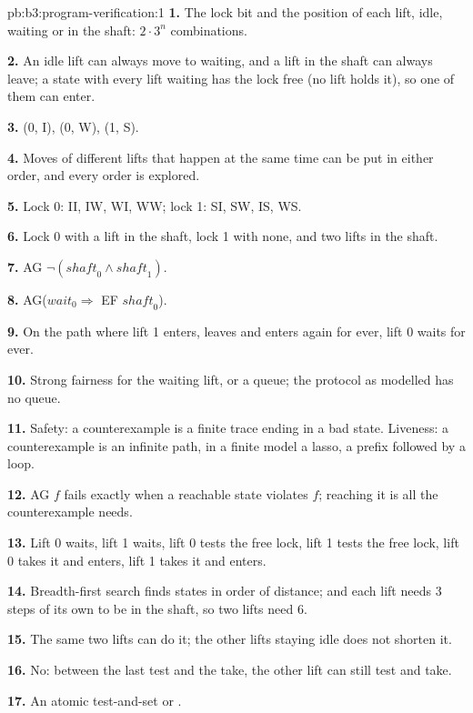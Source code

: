 \begin{solution}{pb:b3:program-verification:1}
\textbf{1.} The lock bit and the position of each lift, idle, waiting or in the shaft: $2 \cdot 3^n$ combinations.

\textbf{2.} An idle lift can always move to waiting, and a lift in the shaft can always leave; a state with every lift waiting has the lock free (no lift holds it), so one of them can enter.

\textbf{3.} (0, I), (0, W), (1, S).

\textbf{4.} Moves of different lifts that happen at the same time can be put in either order, and every order is explored.

\textbf{5.} Lock 0: II, IW, WI, WW; lock 1: SI, SW, IS, WS.

\textbf{6.} Lock 0 with a lift in the shaft, lock 1 with none, and two lifts in the shaft.

\textbf{7.} AG $\neg(\mathit{shaft}_0 \wedge \mathit{shaft}_1)$.

\textbf{8.} AG($\mathit{wait}_0 \Rightarrow$ EF $\mathit{shaft}_0$).

\textbf{9.} On the path where lift 1 enters, leaves and enters again for ever, lift 0 waits for ever.

\textbf{10.} Strong fairness for the waiting lift, or a queue; the protocol as modelled has no queue.

\textbf{11.} Safety: a counterexample is a finite trace ending in a bad state. Liveness: a counterexample is an infinite path, in a finite model a lasso, a prefix followed by a loop.

\textbf{12.} AG $f$ fails exactly when a reachable state violates $f$; reaching it is all the counterexample needs.

\textbf{13.} Lift 0 waits, lift 1 waits, lift 0 tests the free lock, lift 1 tests the free lock, lift 0 takes it and enters, lift 1 takes it and enters.

\textbf{14.} Breadth-first search finds states in order of distance; and each lift needs 3 steps of its own to be in the shaft, so two lifts need 6.

\textbf{15.} The same two lifts can do it; the other lifts staying idle does not shorten it.

\textbf{16.} No: between the last test and the take, the other lift can still test and take.

\textbf{17.} An atomic test-and-set or .


\end{solution}
